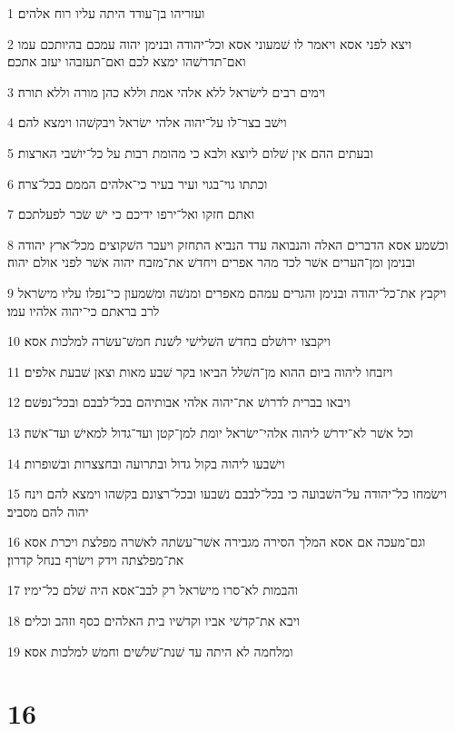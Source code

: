 \par 1 ועזריהו בן־עודד היתה עליו רוח אלהים׃
\par 2 ויצא לפני אסא ויאמר לו שׁמעוני אסא וכל־יהודה ובנימן יהוה עמכם בהיותכם עמו ואם־תדרשׁהו ימצא לכם ואם־תעזבהו יעזב אתכם׃
\par 3 וימים רבים לישׂראל ללא אלהי אמת וללא כהן מורה וללא תורה׃
\par 4 וישׁב בצר־לו על־יהוה אלהי ישׂראל ויבקשׁהו וימצא להם׃
\par 5 ובעתים ההם אין שׁלום ליוצא ולבא כי מהומת רבות על כל־יושׁבי הארצות׃
\par 6 וכתתו גוי־בגוי ועיר בעיר כי־אלהים הממם בכל־צרה׃
\par 7 ואתם חזקו ואל־ירפו ידיכם כי ישׁ שׂכר לפעלתכם׃
\par 8 וכשׁמע אסא הדברים האלה והנבואה עדד הנביא התחזק ויעבר השׁקוצים מכל־ארץ יהודה ובנימן ומן־הערים אשׁר לכד מהר אפרים ויחדשׁ את־מזבח יהוה אשׁר לפני אולם יהוה׃
\par 9 ויקבץ את־כל־יהודה ובנימן והגרים עמהם מאפרים ומנשׁה ומשׁמעון כי־נפלו עליו מישׂראל לרב בראתם כי־יהוה אלהיו עמו׃
\par 10 ויקבצו ירושׁלם בחדשׁ השׁלישׁי לשׁנת חמשׁ־עשׂרה למלכות אסא׃
\par 11 ויזבחו ליהוה ביום ההוא מן־השׁלל הביאו בקר שׁבע מאות וצאן שׁבעת אלפים׃
\par 12 ויבאו בברית לדרושׁ את־יהוה אלהי אבותיהם בכל־לבבם ובכל־נפשׁם׃
\par 13 וכל אשׁר לא־ידרשׁ ליהוה אלהי־ישׂראל יומת למן־קטן ועד־גדול למאישׁ ועד־אשׁה׃
\par 14 וישׁבעו ליהוה בקול גדול ובתרועה ובחצצרות ובשׁופרות׃
\par 15 וישׂמחו כל־יהודה על־השׁבועה כי בכל־לבבם נשׁבעו ובכל־רצונם בקשׁהו וימצא להם וינח יהוה להם מסביב׃
\par 16 וגם־מעכה אם אסא המלך הסירה מגבירה אשׁר־עשׂתה לאשׁרה מפלצת ויכרת אסא את־מפלצתה וידק וישׂרף בנחל קדרון׃
\par 17 והבמות לא־סרו מישׂראל רק לבב־אסא היה שׁלם כל־ימיו׃
\par 18 ויבא את־קדשׁי אביו וקדשׁיו בית האלהים כסף וזהב וכלים׃
\par 19 ומלחמה לא היתה עד שׁנת־שׁלשׁים וחמשׁ למלכות אסא׃

\chapter{16}

